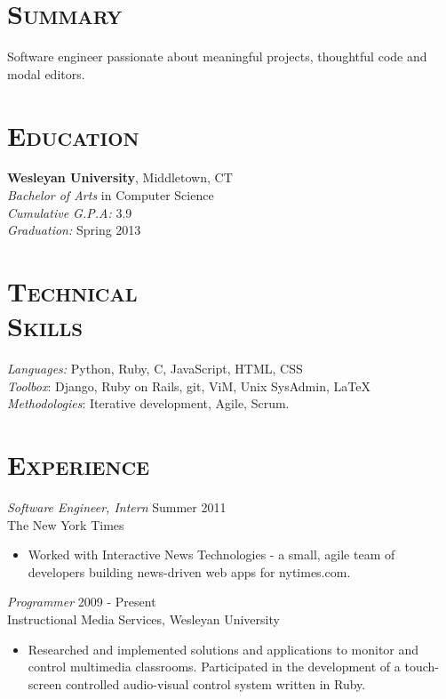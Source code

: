 \documentclass[margin]{res}
\begin{document}
\begin{resume}
\section{\textsc{Summary}} Software engineer passionate about meaningful projects, thoughtful code and modal editors.

\section{\textsc{Education}} {\bf Wesleyan University}, Middletown, CT \\ {\sl Bachelor of Arts} in Computer Science \\
    {\sl Cumulative G.P.A:} 3.9\\
    {\sl Graduation:} Spring 2013
 
 
\section{\textsc{Technical \\ Skills}}
    {\sl Languages:} Python, Ruby, C, JavaScript, HTML, CSS \\
    {\sl Toolbox}: Django, Ruby on Rails, git, ViM, Unix SysAdmin, \LaTeX \\
    {\sl Methodologies}: Iterative development, Agile, Scrum.

\section{\textsc{Experience}}
    {\sl Software Engineer, Intern} \hfill Summer 2011 \\
    The New York Times
    \begin{itemize}  \itemsep -2pt %
        \item Worked with Interactive News Technologies - a small, agile team of developers building news-driven web apps for nytimes.com.
    \end{itemize}

    {\sl Programmer} \hfill 2009 - Present \\
    Instructional Media Services, Wesleyan University
    \begin{itemize}  \itemsep -2pt %
        \item Researched and implemented solutions and applications to monitor and control multimedia classrooms. Participated in the development of a touch-screen controlled audio-visual control system written in Ruby.
    \end{itemize}


\end{resume}
\end{document}
